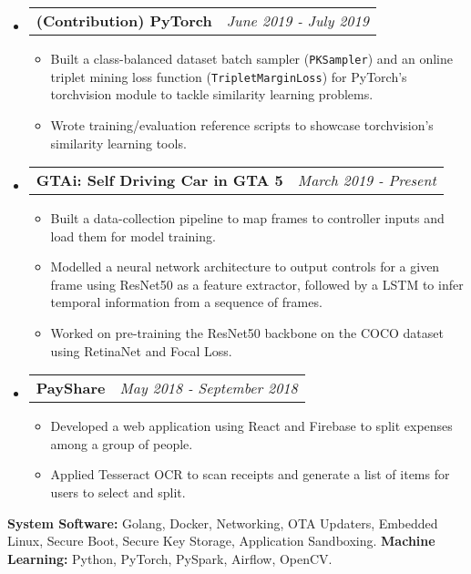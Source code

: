 \documentclass[letterpaper, 11pt]{article}
\makeatletter
\newcommand{\resitem}[1]{\item #1 \vspace{-2pt}}
\newcommand{\resheading}[1]{{\large \parashade[.9]{sharpcorners}{\textbf{#1 \vphantom{p\^{E}}}}}}
\newcommand{\ressubheadinga}[2]{
\begin{tabular*}{7.11in}{l@{\extracolsep{\fill}}r}
		\textbf{#1} & #2 \\
\end{tabular*}}
\makeatother
\begin{document}
\begin{itemize}
\item
    \ressubheadinga{(Contribution) PyTorch}{\emph{June 2019 - July 2019}}
    \vspace{-0.25in}
    \begin{itemize}
            \resitem{Built a class-balanced dataset batch sampler (\texttt{PKSampler}) and an online triplet mining loss function (\texttt{TripletMarginLoss}) for PyTorch's torchvision module to tackle similarity learning problems.}
            \resitem{Wrote training/evaluation reference scripts to showcase torchvision's similarity learning tools.}
    \end{itemize}

\item
    \ressubheadinga{GTAi: Self Driving Car in GTA 5}{\emph{March 2019 - Present}}
    \vspace{-0.25in}
    \begin{itemize}
            \resitem{Built a data-collection pipeline to map frames to controller inputs and load them for model training.}
            \resitem{Modelled a neural network architecture to output controls for a given frame using ResNet50 as a feature extractor, followed by a LSTM to infer temporal information from a sequence of frames.}
            \resitem{Worked on pre-training the ResNet50 backbone on the COCO dataset using RetinaNet and Focal Loss.}
    \end{itemize}

\item
    \ressubheadinga{PayShare}{\emph{May 2018 - September 2018}}
    \vspace{-0.25in}
    \begin{itemize}
        \resitem{Developed a web application using React and Firebase to split expenses among a group of people.}
        \resitem{Applied Tesseract OCR to scan receipts and generate a list of items for users to select and split.}
    \end{itemize}

\end{itemize}

\vspace{-0.16in}
\resheading{Skills}
\vspace{-0.10in}

\textbf{System Software:} Golang, Docker, Networking, OTA Updaters, Embedded Linux, Secure Boot, Secure Key Storage, Application Sandboxing.\newline
\textbf{Machine Learning:} Python, PyTorch, PySpark, Airflow, OpenCV.
\end{document}
